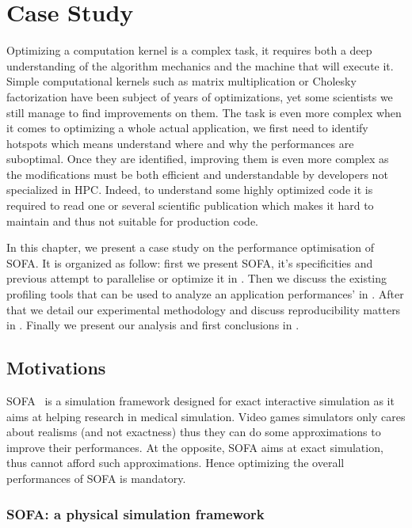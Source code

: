 \chapter{Case Study}
\label{chap:perf}

Optimizing a computation kernel is a complex task, it requires both a deep understanding of the algorithm mechanics and the machine that will execute it.
Simple computational kernels such as matrix multiplication or Cholesky factorization have been subject of years of optimizations, yet some scientists we still manage to find improvements on them.
The task is even more complex when it comes to optimizing a whole actual application, we first need to identify hotspots which means understand where and why the performances are suboptimal.
Once they are identified, improving them is even more complex as the modifications must be both efficient and understandable by developers not specialized in \gls{HPC}.
Indeed, to understand some highly optimized code it is required to read one or several scientific publication which makes it hard to maintain and thus not suitable for production code.

In this chapter, we present a case study on the performance optimisation of \gls{SOFA}.
It is organized as follow: first we present \gls{SOFA}, it's specificities and previous attempt to parallelise or optimize it in .
Then we discuss the existing profiling tools that can be used to analyze an application performances' in .
After that we detail our experimental methodology and discuss reproducibility matters in .
Finally we present our analysis and first conclusions in .

\section{Motivations}
\label{sec:motivations}

\gls{SOFA}~\cite{Allard07SOFA} is a simulation framework designed for exact interactive simulation as it aims at helping research in medical simulation.
Video games simulators only cares about realisms (and not exactness) thus they can do some approximations to improve their performances.
At the opposite, \gls{SOFA} aims at exact simulation, thus cannot afford such approximations.
Hence optimizing the overall performances of \gls{SOFA} is mandatory.


\subsection{SOFA: a physical simulation framework}

